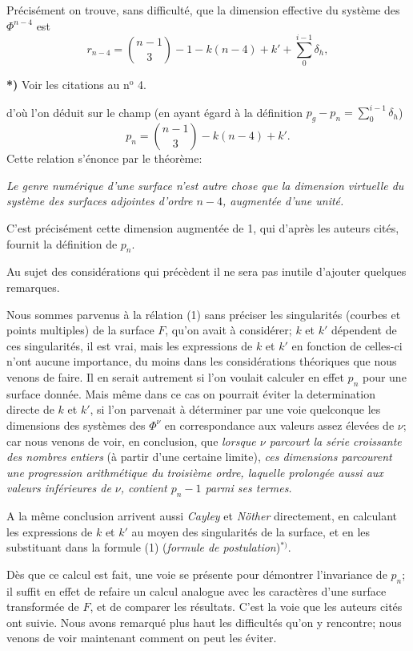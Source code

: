\documentclass{article}
\begin{document}
Précisément on trouve, sans difficulté, que la dimension effective du système des $\Phi^{n-4}$ est
\[
r_{n-4} = \binom{n-1}{3} - 1 - k(n-4) + k' + \sum_{0}^{i-1} \delta_{h},
\]

\textbf{*)} Voir les citations au n${}^{\text{o}}$ 4.

d'où l'on déduit sur le champ (en ayant égard à la définition $\displaystyle p_{g} - p_{n} = \sum_{0}^{i-1} \delta_{h}$)
\[
p_{n} = \binom{n-1}{3} - k(n-4) + k'.
\]
Cette relation s'énonce par le théorème:

\emph{Le genre numérique d'une surface n'est autre chose que la dimension virtuelle du système des surfaces adjointes d'ordre $n-4$, augmentée d'une unité.}

C'est précisément cette dimension augmentée de 1, qui d'après les auteurs cités, fournit la définition de $p_{n}$.

Au sujet des considérations qui précèdent il ne sera pas inutile d'ajouter quelques remarques.

Nous sommes parvenus à la rélation (1) sans préciser les singularités (courbes et points multiples) de la surface $F$, qu'on avait à considérer; $k$ et $k'$ dépendent de ces singularités, il est vrai, mais les expressions de $k$ et $k'$ en fonction de celles-ci n'ont aucune importance, du moins dans les considérations théoriques que nous venons de faire. Il en serait autrement si l'on voulait calculer en effet $p_{n}$ pour une surface donnée. Mais même dans ce cas on pourrait éviter la determination directe de $k$ et $k'$, si l'on parvenait à déterminer par une voie quelconque les dimensions des systèmes des $\Phi^{\nu}$ en correspondance aux valeurs assez élevées de $\nu$; car nous venons de voir, en conclusion, que \emph{lorsque $\nu$ parcourt la série croissante des nombres entiers} (à partir d'une certaine limite), \emph{ces dimensions parcourent une progression arithmétique du troisième ordre, laquelle prolongée aussi aux valeurs inférieures de $\nu$, contient $p_{n} - 1$ parmi ses termes.}

A la même conclusion arrivent aussi \emph{Cayley} et \emph{Nöther} directement, en calculant les expressions de $k$ et $k'$ au moyen des singularités de la surface, et en les substituant dans la formule (1) (\emph{formule de postulation})${}^{*)}$.

Dès que ce calcul est fait, une voie se présente pour démontrer l'invariance de $p_{n}$; il suffit en effet de refaire un calcul analogue avec les caractères d'une surface transformée de $F$, et de comparer les résultats. C'est la voie que les auteurs cités ont suivie. Nous avons remarqué plus haut les difficultés qu'on y rencontre; nous venons de voir maintenant comment on peut les éviter.
\end{document}
